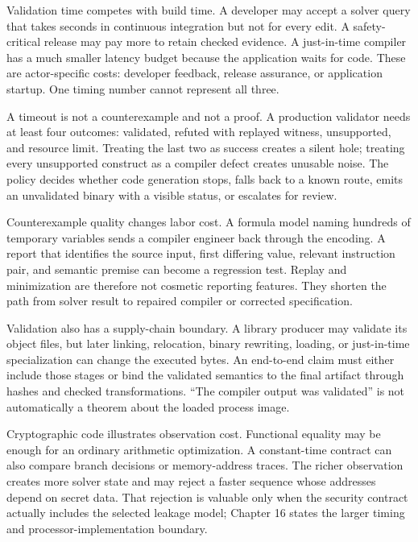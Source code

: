 Validation time competes with build time. A developer may accept a solver
query that takes seconds in continuous integration but not for every edit. A
safety-critical release may pay more to retain checked evidence. A just-in-time
compiler has a much smaller latency budget because the application waits for
code. These are actor-specific costs: developer feedback, release assurance,
or application startup. One timing number cannot represent all three.

A timeout is not a counterexample and not a proof. A production validator needs
at least four outcomes: validated, refuted with replayed witness, unsupported,
and resource limit. Treating the last two as success creates a silent hole;
treating every unsupported construct as a compiler defect creates unusable
noise. The policy decides whether code generation stops, falls back to a known
route, emits an unvalidated binary with a visible status, or escalates for
review.

Counterexample quality changes labor cost. A formula model naming hundreds of
temporary variables sends a compiler engineer back through the encoding. A
report that identifies the source input, first differing value, relevant
instruction pair, and semantic premise can become a regression test. Replay
and minimization are therefore not cosmetic reporting features. They shorten
the path from solver result to repaired compiler or corrected specification.

Validation also has a supply-chain boundary. A library producer may validate
its object files, but later linking, relocation, binary rewriting, loading, or
just-in-time specialization can change the executed bytes. An end-to-end claim
must either include those stages or bind the validated semantics to the final
artifact through hashes and checked transformations. ``The compiler output was
validated'' is not automatically a theorem about the loaded process image.

Cryptographic code illustrates observation cost. Functional equality may be
enough for an ordinary arithmetic optimization. A constant-time contract can
also compare branch decisions or memory-address traces. The richer observation
creates more solver state and may reject a faster sequence whose addresses
depend on secret data. That rejection is valuable only when the security
contract actually includes the selected leakage model; Chapter 16 states the
larger timing and processor-implementation boundary.

